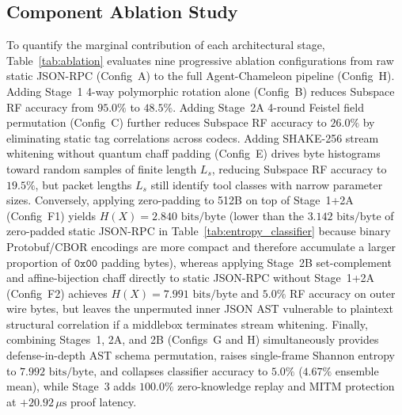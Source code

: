 \documentclass[conference,10pt]{IEEEtran}
\begin{document}
\subsection{Component Ablation Study}
To quantify the marginal contribution of each architectural stage, Table~\ref{tab:ablation} evaluates nine progressive ablation configurations from raw static JSON-RPC (Config~A) to the full Agent-Chameleon pipeline (Config~H). Adding Stage~1 4-way polymorphic rotation alone (Config~B) reduces Subspace RF accuracy from $95.0\%$ to $48.5\%$. Adding Stage~2A 4-round Feistel field permutation (Config~C) further reduces Subspace RF accuracy to $26.0\%$ by eliminating static tag correlations across codecs. Adding SHAKE-256 stream whitening without quantum chaff padding (Config~E) drives byte histograms toward random samples of finite length $L_s$, reducing Subspace RF accuracy to $19.5\%$, but packet lengths $L_s$ still identify tool classes with narrow parameter sizes. Conversely, applying zero-padding to 512B on top of Stage~1+2A (Config~F1) yields $H(X) = 2.840\text{ bits/byte}$ (lower than the $3.142\text{ bits/byte}$ of zero-padded static JSON-RPC in Table~\ref{tab:entropy_classifier} because binary Protobuf/CBOR encodings are more compact and therefore accumulate a larger proportion of $\mathtt{0x00}$ padding bytes), whereas applying Stage~2B set-complement and affine-bijection chaff directly to static JSON-RPC without Stage~1+2A (Config~F2) achieves $H(X) = 7.991\text{ bits/byte}$ and $5.0\%$ RF accuracy on outer wire bytes, but leaves the unpermuted inner JSON AST vulnerable to plaintext structural correlation if a middlebox terminates stream whitening. Finally, combining Stages~1, 2A, and 2B (Configs~G and H) simultaneously provides defense-in-depth AST schema permutation, raises single-frame Shannon entropy to $7.992\text{ bits/byte}$, and collapses classifier accuracy to $5.0\%$ ($4.67\%$ ensemble mean), while Stage~3 adds $100.0\%$ zero-knowledge replay and MITM protection at $+20.92\,\mu\text{s}$ proof latency.
\end{document}
